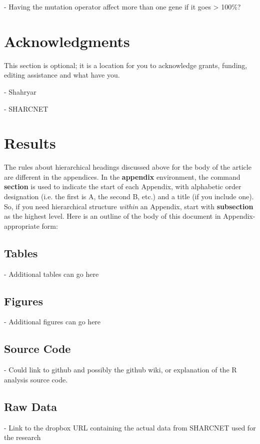 \documentclass{sig-alternate}
\begin{document}
- Having the mutation operator affect more than one gene if it goes > 100\%? 

\begin{flushleft}\end{flushleft}



\section{Acknowledgments}
This section is optional; it is a location for you
to acknowledge grants, funding, editing assistance and
what have you.

- Shahryar

- SHARCNET


%

%
%

\appendix
\section{Results}
The rules about hierarchical headings discussed above for
the body of the article are different in the appendices.
In the \textbf{appendix} environment, the command
\textbf{section} is used to
indicate the start of each Appendix, with alphabetic order
designation (i.e. the first is A, the second B, etc.) and
a title (if you include one).  So, if you need
hierarchical structure
\textit{within} an Appendix, start with \textbf{subsection} as the
highest level. Here is an outline of the body of this
document in Appendix-appropriate form:

\subsection{Tables}

- Additional tables can go here

\subsection{Figures}

- Additional figures can go here

\subsection{Source Code}

- Could link to github and possibly the github wiki, or explanation
  of the R analysis source code.

\subsection{Raw Data}

- Link to the dropbox URL containing the actual data from SHARCNET used for the research
\end{document}
